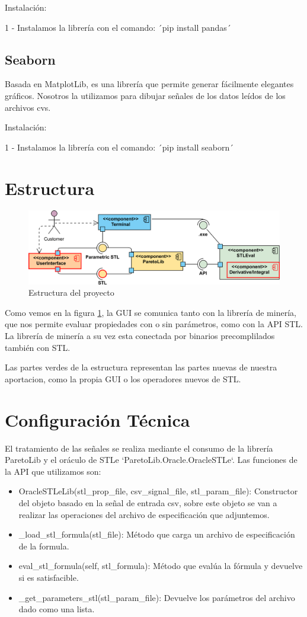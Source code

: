 Instalación: 
 
1 - Instalamos la librería con el comando: ´pip install pandas´

\subsection{Seaborn} 
Basada en MatplotLib, es una librería que permite generar fácilmente elegantes gráficos. Nosotros la utilizamos para dibujar señales de los datos leídos de los archivos cvs.
 
Instalación: 
 
1 - Instalamos la librería con el comando: ´pip install seaborn´

\section{Estructura}
\begin{figure}[htb]
\centering
  \includegraphics[width=.95\linewidth]{images/uml_diagram} 
\caption{Estructura del proyecto}
\label{fig:est}
\end{figure}
Como vemos en la figura \ref{fig:est}, la GUI se comunica tanto con la librería de minería, que nos permite evaluar propiedades con o sin parámetros, como con la API STL. La librería de minería a su vez esta conectada por binarios precomplilados también con STL.

Las partes verdes de la estructura representan las partes nuevas de nuestra aportacion, como la propia GUI o los operadores nuevos de STL.
 
\section{Configuración Técnica}
El tratamiento de las señales se realiza mediante el consumo de la librería ParetoLib y el oráculo de STLe `ParetoLib.Oracle.OracleSTLe`. Las funciones de la API que utilizamos son: 
\begin{itemize}
\item OracleSTLeLib(stl\_prop\_file, csv\_signal\_file, stl\_param\_file): Constructor del objeto basado en la señal de entrada csv, sobre este objeto se van a realizar las operaciones del archivo de especificación que adjuntemos. 
\item \_load\_stl\_formula(stl\_file): Método que carga un archivo de especificación de la formula. 
\item eval\_stl\_formula(self, stl\_formula): Método que evalúa la fórmula y devuelve si es satisfacible.
\item \_get\_parameters\_stl(stl\_param\_file): Devuelve los parámetros del archivo dado como una lista.
\end{itemize} 

